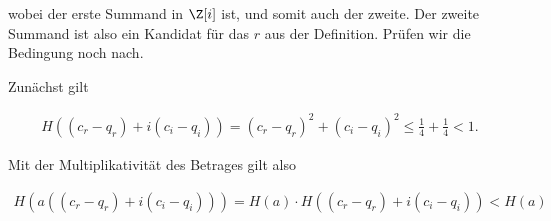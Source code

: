 \begin{solution}
wobei der erste Summand in $\Z [i]$ ist, und somit auch der zweite. Der zweite Summand ist also ein Kandidat für das $r$ aus der Definition. Prüfen wir die Bedingung noch nach.

Zunächst gilt

\begin{align*}
  H((c_r- q_r) + i (c_i - q_i)) = (c_r- q_r)^2 + (c_i - q_i)^2 \leq \frac{1}{4} + \frac{1}{4} < 1.
\end{align*}

Mit der Multiplikativität des Betrages gilt also

\begin{align*}
  H(a((c_r- q_r) + i (c_i - q_i))) = H(a) \cdot H((c_r- q_r) + i (c_i - q_i)) < H(a)
\end{align*}


\end{solution}

